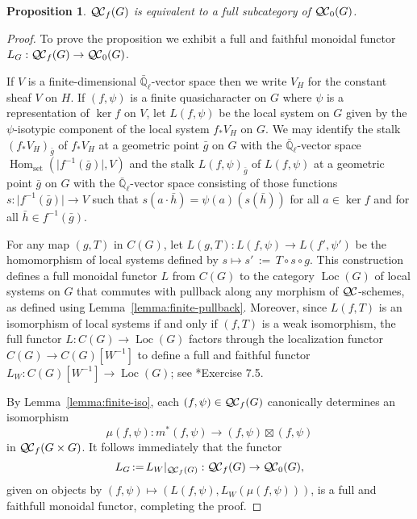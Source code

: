 \documentclass{amsart}
\theoremstyle{plain}
\newtheorem{proposition}[theorem]{Proposition}
\theoremstyle{definition}
\theoremstyle{remark}
\newcommand{\EE}{\mathbb{\bar Q}_\ell}
\DeclareMathOperator{\Hom}{Hom}
\DeclareMathOperator{\Loc}{Loc}
\newcommand{\abs}[1]{{\vert #1 \vert}}
\newcommand{\ceq}{{\, :=\, }}
\newcommand{\QC}{{\mathcal{Q\hskip-0.8pt C}}}
\newcommand{\QCb}{{\QC_0}}
\newcommand{\QCf}{{\QC_f}}
\begin{document}
\begin{proposition}\label{prop:bounded}
 $\QCf(G)$ is equivalent to a full subcategory of $\QCb(G)$.
\end{proposition}

\begin{proof}
 To prove the proposition we exhibit a full and faithful monoidal functor $L_G : \QCf(G) \to \QCb(G)$.

 If $V$ is a finite-dimensional $\EE$-vector space then we write $V_H$ for the constant sheaf $V$ on $H$.
If $(f,\psi)$ is a finite quasicharacter on $G$ where $\psi$ is a representation of $\ker f$ on $V$,
let $L(f,\psi)$ be the local system on $G$ given by the $\psi$-isotypic component of the local system $f_* V_H$ on $G$.
 We may identify the stalk $(f_* V_H)_{\bar g}$ of $f_* V_H$ at a geometric point ${\bar g}$ on $G$
 with the $\EE$-vector space $\Hom_\text{set}(\abs{f^{-1}({\bar g})},V)$
 and the stalk $L(f,\psi)_{\bar g}$ of $L(f,\psi)$ at a geometric point ${\bar g}$ on $G$
 with the $\EE$-vector space consisting of those functions $s: \abs{f^{-1}({\bar g})} \to V$ such that
 $s(a\cdot {\bar h}) = \psi(a)(s({\bar h}))$ for all $a\in \ker f$ and for all ${\bar h} \in f^{-1}({\bar g})$.

 For any map $(g,T)$ in $C(G)$, let $L(g,T) : L(f,\psi) \to L(f',\psi')$ be the homomorphism of local systems defined
 by $s \mapsto s' \ceq T\circ s\circ g$.
 This construction defines a full monoidal functor $L$ from $C(G)$ to the category $\Loc(G)$ of local systems on $G$ that
 commutes with pullback along any morphism of $\QC$-schemes,
 as defined using Lemma~\ref{lemma:finite-pullback}.
 Moreover, since $L(f,T)$ is an isomorphism of local systems
 if and only if $(f,T)$ is a weak isomorphism,
 the full functor $L : C(G) \to \Loc(G)$ factors through the localization functor $C(G) \to C(G)[W^{-1}]$
 to define a full and faithful functor $L_{W} : C(G)[W^{-1}] \to \Loc(G)$;
 see \cite{kashiwara-schapira:CatgoriesSheaves}*{Exercise 7.5}.

 By Lemma~\ref{lemma:finite-iso}, each $(f,\psi) \in \QCf(G)$ canonically determines
 an isomorphism
 \[
 \mu(f,\psi) : m^*(f,\psi) \to (f,\psi) \boxtimes (f,\psi)
 \]
 in $\QCf(G\times G)$.
 It follows immediately that the functor
 \[
 L_G  \ceq  L_{W}\vert_{\QCf(G)} : \QCf(G) \to \QCb(G),
 \]
 given on objects by $(f,\psi) \mapsto (L(f,\psi), L_{W}(\mu(f,\psi)))$,
 is a full and faithfull monoidal functor, completing the proof.
\end{proof}
\end{document}
